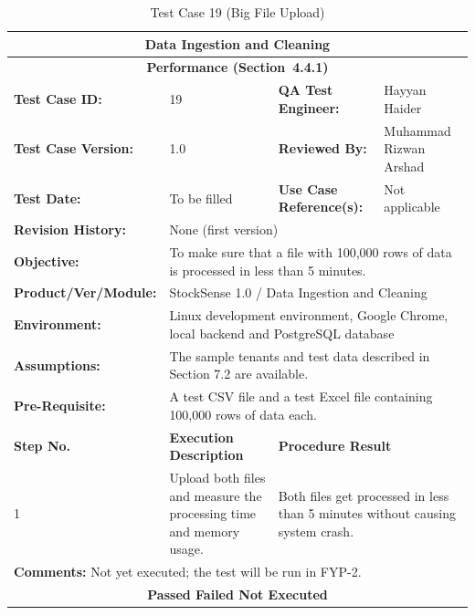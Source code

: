 \documentclass{StockSense}
\begin{document}
\begin{table}[!htbp]
\centering
\caption{Test Case 19 (Big File Upload)}
{\small\linespread{1}\selectfont\renewcommand{\arraystretch}{1.25}
\begin{tabular}{|p{}|p{}|p{}|p{}|}
\hline
\multicolumn{4}{|c|}{\textbf{Data Ingestion and Cleaning}} \\ \hline
\multicolumn{4}{|c|}{\textbf{Performance (Section~4.4.1)}} \\ \hline
\textbf{Test Case ID:} & 19 & \textbf{QA Test Engineer:} & Hayyan Haider \\ \hline
\textbf{Test Case Version:} & 1.0 & \textbf{Reviewed By:} & Muhammad Rizwan Arshad \\ \hline
\textbf{Test Date:} & To be filled & \textbf{Use Case Reference(s):} & Not applicable \\ \hline
\textbf{Revision History:} & \multicolumn{3}{p{\dimexpr0.70\textwidth+4\tabcolsep\relax}|}{None (first version)} \\ \hline
\textbf{Objective:} & \multicolumn{3}{p{\dimexpr0.70\textwidth+4\tabcolsep\relax}|}{To make sure that a file with 100,000 rows of data is processed in less than 5 minutes.} \\ \hline
\textbf{Product/Ver/Module:} & \multicolumn{3}{p{\dimexpr0.70\textwidth+4\tabcolsep\relax}|}{StockSense 1.0 / Data Ingestion and Cleaning} \\ \hline
\textbf{Environment:} & \multicolumn{3}{p{\dimexpr0.70\textwidth+4\tabcolsep\relax}|}{Linux development environment, Google Chrome, local backend and PostgreSQL database} \\ \hline
\textbf{Assumptions:} & \multicolumn{3}{p{\dimexpr0.70\textwidth+4\tabcolsep\relax}|}{The sample tenants and test data described in Section 7.2 are available.} \\ \hline
\textbf{Pre-Requisite:} & \multicolumn{3}{p{\dimexpr0.70\textwidth+4\tabcolsep\relax}|}{A test CSV file and a test Excel file containing 100,000 rows of data each.} \\ \hline
\textbf{Step No.} & \textbf{Execution Description} & \multicolumn{2}{l|}{\textbf{Procedure Result}} \\ \hline
1 & Upload both files and measure the processing time and memory usage. & \multicolumn{2}{p{\dimexpr0.42\textwidth+2\tabcolsep\relax}|}{Both files get processed in less than 5 minutes without causing system crash.} \\ \hline
\multicolumn{4}{|l|}{\textbf{Comments:} Not yet executed; the test will be run in FYP-2.} \\ \hline
\multicolumn{4}{|c|}{\textbf{Passed \quad Failed \quad Not Executed}} \\ \hline
\end{tabular}\par}
\end{table}
\end{document}
